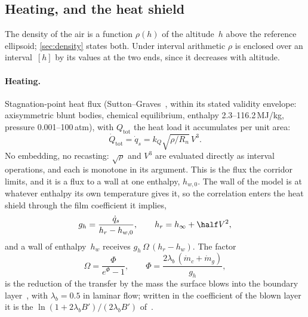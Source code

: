 \subsection{Heating, and the heat shield}\label{sec:thermal}

The density of the air is a function $\rho(h)$ of the altitude~$h$ above
the reference ellipsoid; \cref{sec:density} states both. Under interval
arithmetic $\rho$ is enclosed over an interval~$[h]$ by its values at the
two ends, since it decreases with altitude.

\paragraph{Heating.}
Stagnation-point heat flux (Sutton--Graves~\cite{sutton1971general}, within
its stated validity envelope: axisymmetric blunt bodies, chemical
equilibrium, enthalpy 2.3--116.2\,MJ/kg, pressure 0.001--100\,atm), with
$Q_{\mathrm{tot}}$ the heat load it accumulates per unit area:
\begin{equation}\label{eq:Qdot}
  \dot Q_{\mathrm{tot}} = \dot q_s = k_Q\sqrt{\rho/R_n}\,V^3.
\end{equation}
No embedding, no recasting: $\sqrt{\rho}$ and $V^3$ are evaluated directly
as interval operations, and each is monotone in its argument. This is the
flux the corridor limits, and it is a flux to a wall at one enthalpy,
$h_{w,0}$. The wall of the model is at whatever enthalpy its own temperature
gives it, so the correlation enters the heat shield through the film
coefficient it implies,
\begin{equation}\label{eq:film}
  g_h = \frac{\dot q_s}{h_r - h_{w,0}},
  \qquad
  h_r = h_\infty + \half V^2 ,
\end{equation}
and a wall of enthalpy~$h_w$ receives $g_h\,\Omega\,(h_r - h_w)$. The factor
\begin{equation}\label{eq:blowing}
  \Omega = \frac{\Phi}{e^{\Phi}-1},
  \qquad
  \Phi = \frac{2\lambda_b\,(\dot m_c + \dot m_g)}{g_h},
\end{equation}
is the reduction of the transfer by the mass the surface blows into the
boundary layer~\cite[Eq.~(31)]{amar2008onedimensional}, with
$\lambda_b = 0.5$ in laminar flow; written in the coefficient of the blown
layer it is the $\ln(1+2\lambda_b B')/(2\lambda_b B')$
of~\cite[Eq.~(11)]{chen1999ablation}.

